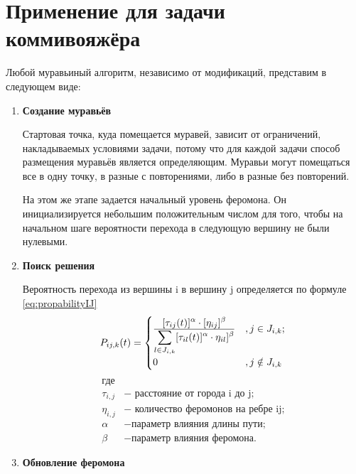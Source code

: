 \documentclass[12pt]{report}
\begin{document}
    \section{Применение для задачи коммивояжёра}
    Любой муравьиный алгоритм, независимо от модификаций, представим в следующем виде:
    \begin{enumerate}
    	\item \textbf{Создание муравьёв}
    	
    	Стартовая точка, куда помещается муравей, зависит от ограничений, накладываемых условиями задачи, потому что для каждой задачи способ размещения муравьёв является определяющим. Муравьи могут помещаться все в одну точку, в разные с повторениями, либо в разные без повторений. 
    	
    	На этом же этапе задается начальный уровень феромона. Он инициализируется небольшим положительным числом для того, чтобы на начальном шаге вероятности перехода в следующую вершину не были нулевыми. 
    	
    	\item \textbf{Поиск решения}
    	
    	Вероятность перехода из вершины i в вершину j определяется по формуле \ref{eq:propabilityIJ} 
    	\begin{equation}
    		\label{eq:propabilityIJ}
    		P_{i j, k} (t)= \begin{cases}
    			\displaystyle[\tau_{ij}(t)]^\alpha \cdot [\eta_{ij}]^\beta\over 
    			\displaystyle\sum\limits_{l \in J_{i, k }} [\tau_{il}(t)]^\alpha \cdot \eta_{il}]^\beta &, j \in J_{i, k};\\
    			0 &, j \notin J_{i, k}
    		\end{cases}
    	\end{equation}
    	\begin{align*}
    		\text{где} \\
    		\tau _{i,j} &- \text{ расстояние от города i до j;} \\
    		\eta _{i,j} &- \text{ количество феромонов на ребре ij;} \\
    		\alpha &- \text{параметр влияния длины пути;} \\
    		\beta &- \text{параметр влияния феромона.}
    	\end{align*}
    	
    	\item \textbf{Обновление феромона}
    	

\end{enumerate}
\end{document}
